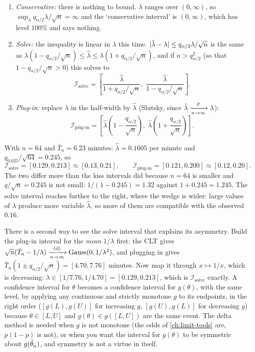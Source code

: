 \begin{enumerate}[nosep]
\item \textit{Conservative:} there is nothing to bound. $\lambda$ ranges over $(0, \infty)$, so $\sup_\lambda q_{\alpha/2}\lambda/\sqrt{n} = \infty$ and the `conservative interval' is $(0, \infty)$, which has level $100\%$ and says nothing.
\item \textit{Solve:} the inequality is linear in $\lambda$ this time. $\lvert\hat{\lambda} - \lambda\rvert \leq q_{\alpha/2}\lambda/\sqrt{n}$ is the same as $\lambda(1 - q_{\alpha/2}/\sqrt{n}) \leq \hat{\lambda} \leq \lambda(1 + q_{\alpha/2}/\sqrt{n})$, and if $n > q_{\alpha/2}^2$ (so that $1 - q_{\alpha/2}/\sqrt{n} > 0$) this solves to
\[
\mathcal{I}_{\text{solve}} = \left[ \frac{\hat{\lambda}}{1 + q_{\alpha/2}/\sqrt{n}}, \; \frac{\hat{\lambda}}{1 - q_{\alpha/2}/\sqrt{n}} \right].
\]
\item \textit{Plug-in:} replace $\lambda$ in the half-width by $\hat{\lambda}$ (Slutsky, since $\hat{\lambda} \xrightarrow [n \to \infty ]{\mathbb{P}} \lambda$):
\[
\mathcal{I}_{\text{plug-in}} = \left[ \hat{\lambda} \left( 1 - \frac{q_{\alpha/2}}{\sqrt{n}} \right), \; \hat{\lambda} \left( 1 + \frac{q_{\alpha/2}}{\sqrt{n}} \right) \right].
\]
\end{enumerate}
With $n = 64$ and $\bar{T}_n = 6.23$ minutes: $\hat{\lambda} = 0.1605$ per minute and $q_{0.025}/\sqrt{64} = 0.245$, so
\[
\mathcal{I}_{\text{solve}} = [0.129, 0.213] \approx [0.13, 0.21], \qquad \mathcal{I}_{\text{plug-in}} = [0.121, 0.200] \approx [0.12, 0.20].
\]
The two differ more than the kiss intervals did because $n = 64$ is smaller and $q/\sqrt{n} = 0.245$ is not small: $1/(1 - 0.245) = 1.32$ against $1 + 0.245 = 1.245$.
The solve interval reaches further to the right, where the wedge is wider: large values of $\lambda$ produce more variable $\hat{\lambda}$, so more of them are compatible with the observed $0.16$.

\begin{remark}
There is a second way to see the solve interval that explains its asymmetry.
Build the plug-in interval for the \textit{mean} $1/\lambda$ first: the CLT gives $\sqrt{n}(\bar{T}_n - 1/\lambda) \xrightarrow [n \to \infty ]{\text{(d)}} \text{Gauss}(0, 1/\lambda^2)$, and plugging in gives $\bar{T}_n(1 \pm q_{\alpha/2}/\sqrt{n}) = [4.70, 7.76]$ minutes.
Now map it through $x \mapsto 1/x$, which is decreasing: $\lambda \in [1/7.76, 1/4.70] = [0.129, 0.213]$, which is $\mathcal{I}_{\text{solve}}$ exactly.
A confidence interval for $\theta$ becomes a confidence interval for $g(\theta)$, with the same level, by applying any continuous and strictly monotone $g$ to its endpoints, in the right order ($[g(L), g(U)]$ for increasing $g$, $[g(U), g(L)]$ for decreasing $g$) because $\theta \in [L, U]$ and $g(\theta) \in g([L, U])$ are the same event.
The delta method is needed when $g$ is not monotone (the odds of \cref{ch:limit-tools} are, $p(1-p)$ is not), or when you want the interval for $g(\theta)$ to be symmetric about $g(\hat{\theta}_n)$, and symmetry is not a virtue in itself.
\end{remark}

